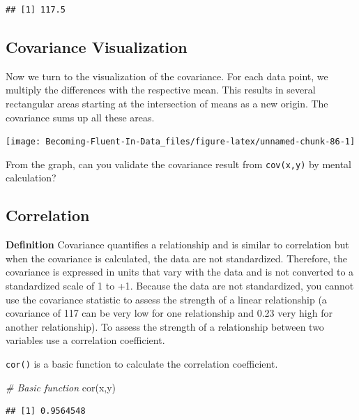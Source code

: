 \documentclass[
]{book}
\newenvironment{Shaded}{\begin{snugshade}}{\end{snugshade}}
\newcommand{\CommentTok}[1]{\textcolor[rgb]{0.56,0.35,0.01}{\textit{#1}}}
\newcommand{\FunctionTok}[1]{\textcolor[rgb]{0.00,0.00,0.00}{#1}}
\newcommand{\NormalTok}[1]{#1}
\begin{document}
\begin{verbatim}
## [1] 117.5
\end{verbatim}

\hypertarget{covariance-visualization}{%
\subsection{Covariance Visualization}\label{covariance-visualization}}

Now we turn to the visualization of the covariance. For each data point, we multiply the differences with the respective mean. This results in several rectangular areas starting at the intersection of means as a new origin. The covariance sums up all these areas.

\begin{center}\texttt{[image: Becoming-Fluent-In-Data\_files/figure-latex/unnamed-chunk-86-1]} \end{center}

From the graph, can you validate the covariance result from \texttt{cov(x,y)} by mental calculation?

\hypertarget{correlation}{%
\subsection{Correlation}\label{correlation}}

\textbf{Definition} Covariance quantifies a relationship and is similar to correlation but when the covariance is calculated, the data are not standardized. Therefore, the covariance is expressed in units that vary with the data and is not converted to a standardized scale of 1 to +1. Because the data are not standardized, you cannot use the covariance statistic to assess the strength of a linear relationship (a covariance of 117 can be very low for one relationship and 0.23 very high for another relationship). To assess the strength of a relationship between two variables use a correlation coefficient.

\texttt{cor()} is a basic function to calculate the correlation coefficient.

\begin{Shaded}
\begin{Highlighting}[]
\CommentTok{\# Basic function}
\FunctionTok{cor}\NormalTok{(x,y)}
\end{Highlighting}
\end{Shaded}

\begin{verbatim}
## [1] 0.9564548
\end{verbatim}
\end{document}
